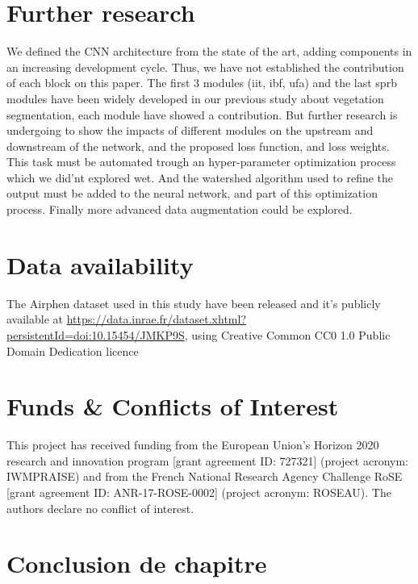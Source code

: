 \documentclass[../thesis.tex]{subfiles}
\begin{document}
    
    \section{Further research}
    
    We defined the CNN architecture from the state of the art, adding components in an increasing development cycle.  Thus, we have not established the contribution of each block on this paper. The first 3 modules (iit, ibf, ufa) and the last sprb modules have been widely developed in our previous study about vegetation segmentation, each module have showed a contribution. But further research is undergoing to show the impacts of different modules on the upstream and downstream of the network, and the proposed loss function, and loss weights. This task must be automated trough an hyper-parameter optimization process which we did'nt explored wet. And the watershed algorithm used to refine the output must be added to the neural network, and part of this optimization process. Finally more advanced data augmentation could be explored.
    
    
    \section*{Data availability} The Airphen dataset used in this study have been released and it's publicly available at \url{https://data.inrae.fr/dataset.xhtml?persistentId=doi:10.15454/JMKP9S}, using Creative Common CC0 1.0 Public Domain Dedication licence
    
    
    \section*{Funds \& Conflicts of Interest}This project has received funding from the European Union's Horizon 2020 research and innovation program [grant agreement ID: 727321] (project acronym: IWMPRAISE) and from the French National Research Agency Challenge RoSE [grant agreement ID: ANR-17-ROSE-0002] (project acronym: ROSEAU). The authors declare no conflict of interest.
	
	\newpage
	\section{Conclusion de chapitre}
	
\end{document}
